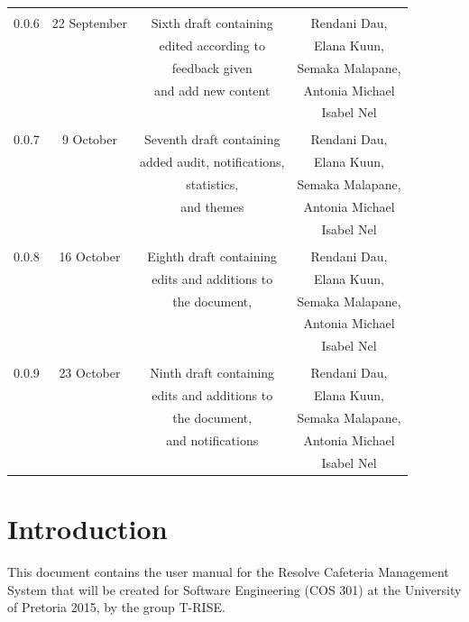 \documentclass[a4paper,12pt]{report}
\begin{document}
\begin{table}[h!]
\begin{tabular}{||c c c c||}
  \hline 
 & & & \\
 0.0.6& 22 September &  Sixth draft containing  & Rendani Dau, \\ & & edited according to & Elana Kuun, \\ & & feedback given & Semaka Malapane, \\ & & and add new content &  Antonia Michael \\ & & & Isabel Nel \\   [1ex]  
 \hline 
 & & & \\
 0.0.7& 9 October &  Seventh draft containing  & Rendani Dau, \\ & & added audit, notifications, & Elana Kuun, \\ & & statistics, & Semaka Malapane, \\ & &  and themes &  Antonia Michael \\ & & & Isabel Nel \\   [1ex]  
 \hline 
 & & & \\
 0.0.8& 16 October &  Eighth draft containing  & Rendani Dau, \\ & & edits and additions to & Elana Kuun, \\ & & the document, & Semaka Malapane, \\ & &  &  Antonia Michael \\ & & & Isabel Nel \\   [1ex]  
 \hline 
 & & & \\
 0.0.9& 23 October &  Ninth draft containing  & Rendani Dau, \\ & & edits and additions to & Elana Kuun, \\ & & the document, & Semaka Malapane, \\ & &  and notifications &  Antonia Michael \\ & & & Isabel Nel \\   [1ex]  
\hline
 \end{tabular}
\end{table}

\pagebreak
\pagebreak

\section{Introduction} 
This document contains the user manual for the Resolve Cafeteria Management System that will be created for Software Engineering (COS 301) at the University of Pretoria 2015, by the group T-RISE.
\end{document}
